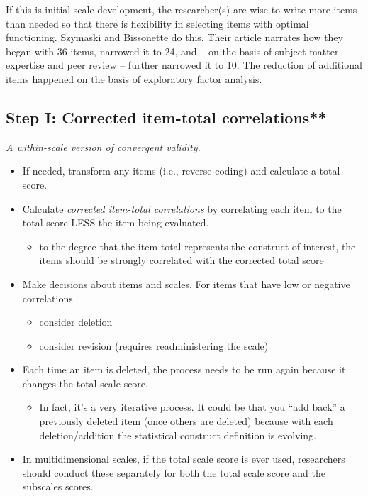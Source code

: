 \documentclass[
  english,
]{book}
\providecommand{\tightlist}{%
  \setlength{\itemsep}{0pt}\setlength{\parskip}{0pt}}
\begin{document}
If this is initial scale development, the researcher(s) are wise to write more items than needed so that there is flexibility in selecting items with optimal functioning. Szymaski and Bissonette \citeyearpar{szymanski_perceptions_2020} do this. Their article narrates how they began with 36 items, narrowed it to 24, and -- on the basis of subject matter expertise and peer review -- further narrowed it to 10. The reduction of additional items happened on the basis of exploratory factor analysis.

\hypertarget{step-i-corrected-item-total-correlations}{%
\subsection{Step I: Corrected item-total correlations**}\label{step-i-corrected-item-total-correlations}}

\emph{A within-scale version of convergent validity.}

\begin{itemize}
\tightlist
\item
  If needed, transform any items (i.e., reverse-coding) and calculate a total score.
\item
  Calculate \emph{corrected item-total correlations} by correlating each item to the total score LESS the item being evaluated.

  \begin{itemize}
  \tightlist
  \item
    to the degree that the item total represents the construct of interest, the items should be strongly correlated with the corrected total score
  \end{itemize}
\item
  Make decisions about items and scales. For items that have low or negative correlations

  \begin{itemize}
  \tightlist
  \item
    consider deletion
  \item
    consider revision (requires readministering the scale)
  \end{itemize}
\item
  Each time an item is deleted, the process needs to be run again because it changes the total scale score.

  \begin{itemize}
  \tightlist
  \item
    In fact, it's a very iterative process. It could be that you ``add back'' a previously deleted item (once others are deleted) because with each deletion/addition the statistical construct definition is evolving.
  \end{itemize}
\item
  In multidimensional scales, if the total scale score is ever used, researchers should conduct these separately for both the total scale score and the subscales scores.
\end{itemize}
\end{document}
